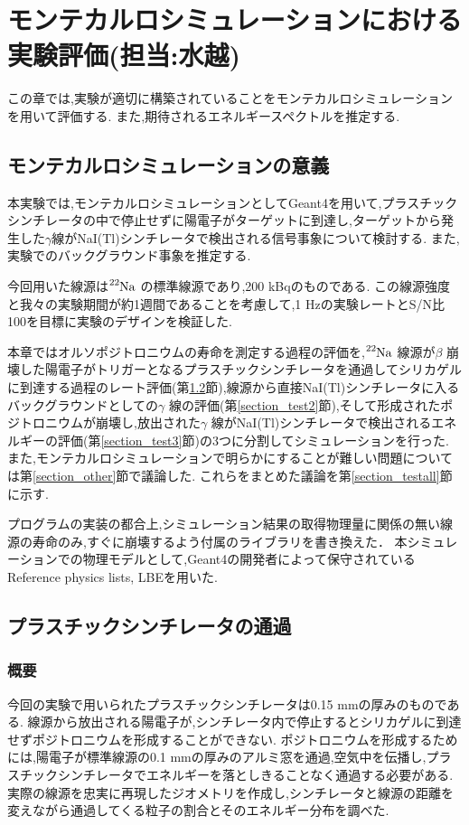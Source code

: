 \chapter{モンテカルロシミュレーションにおける実験評価(担当:水越)}\label{simulation}

この章では,実験が適切に構築されていることをモンテカルロシミュレーションを用いて評価する.
また,期待されるエネルギースペクトルを推定する.

\section{モンテカルロシミュレーションの意義}

本実験では,モンテカルロシミュレーションとしてGeant4\cite{geant4}を用いて,プラスチックシンチレータの中で停止せずに陽電子がターゲットに到達し,ターゲットから発生した$\gamma$線がNaI(Tl)シンチレータで検出される信号事象について検討する.
また,実験でのバックグラウンド事象を推定する.

今回用いた線源は$\ce{^{22}Na}$ の標準線源であり,200 kBqのものである.
この線源強度と我々の実験期間が約1週間であることを考慮して,1 Hzの実験レートとS/N比100を目標に実験のデザインを検証した.


本章ではオルソポジトロニウムの寿命を測定する過程の評価を,$\ce{^{22}Na}$ 線源が$\beta$ 崩壊した陽電子がトリガーとなるプラスチックシンチレータを通過してシリカゲルに到達する過程のレート評価(第\ref{section_test1}節),線源から直接NaI(Tl)シンチレータに入るバックグラウンドとしての$\gamma$ 線の評価(第\ref{section_test2}節),そして形成されたポジトロニウムが崩壊し,放出された$\gamma$ 線がNaI(Tl)シンチレータで検出されるエネルギーの評価(第\ref{section_test3}節)の3つに分割してシミュレーションを行った.
また,モンテカルロシミュレーションで明らかにすることが難しい問題については第\ref{section_other}節で議論した.
これらをまとめた議論を第\ref{section_testall}節に示す.

プログラムの実装の都合上,シミュレーション結果の取得物理量に関係の無い線源の寿命のみ,すぐに崩壊するよう付属のライブラリを書き換えた．
本シミュレーションでの物理モデルとして,Geant4の開発者によって保守されているReference physics lists, LBEを用いた.

\section{プラスチックシンチレータの通過}
\label{section_test1}

\subsection{概要}
今回の実験で用いられたプラスチックシンチレータは0.15 mmの厚みのものである.
線源から放出される陽電子が,シンチレータ内で停止するとシリカゲルに到達せずポジトロニウムを形成することができない.
ポジトロニウムを形成するためには,陽電子が標準線源の0.1 mmの厚みのアルミ窓を通過,空気中を伝播し,プラスチックシンチレータでエネルギーを落としきることなく通過する必要がある.
実際の線源を忠実に再現したジオメトリを作成し,シンチレータと線源の距離を変えながら通過してくる粒子の割合とそのエネルギー分布を調べた.



